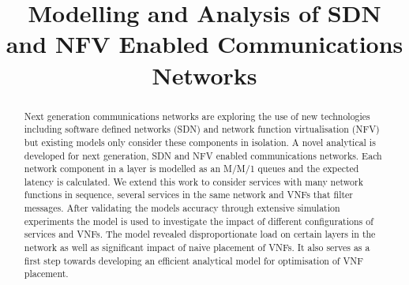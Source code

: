 \documentclass[conference]{IEEEtran}
\begin{document}
\title{Modelling and Analysis of SDN and NFV Enabled Communications Networks}

\author{
}

\maketitle

\begin{abstract}
Next generation communications networks are exploring the use of new technologies including software defined networks (SDN) and network function virtualisation (NFV) but existing models only consider these components in isolation. A novel analytical is developed for next generation, SDN and NFV enabled communications networks. Each network component in a layer is modelled as an M/M/1 queues and the expected latency is calculated. We extend this work to consider services with many network functions in sequence, several services in the same network and VNFs that filter messages. After validating the models accuracy through extensive simulation experiments the model is used to investigate the impact of different configurations of services and VNFs. The model revealed disproportionate load on certain layers in the network as well as significant impact of naive placement of VNFs. It also serves as a first step towards developing an efficient analytical model for optimisation of VNF placement.
\end{abstract}
















\end{document}
